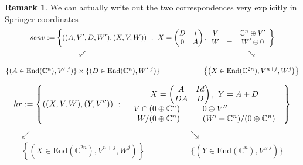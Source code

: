 \documentclass[12pt]{amsart}
\numberwithin{equation}{section}
\theoremstyle{definition}
\newtheorem{Remark}[equation]{Remark}
\numberwithin{figure}{section}
\newcommand{\C}{\mathbb{C}}
\begin{document}
\begin{Remark}
We can actually write out the two correspondences very explicitly in Springer coordinates
\begin{gather*}
senv := \left\{ \left(
    (A,V',D,W'),
    \left(X,V,W\right)\right)
  \ :\
  X = \begin{pmatrix} D & * \\ 0 & A \end{pmatrix}, 
  \begin{array}[c]{ccc} V &=& \C^n \oplus V'\\
    W &=& W'\oplus 0  \end{array}
  \right\} 
\\
\begin{matrix}
  \swarrow &&\searrow \\ \\
  \{(A \in \mathrm{End}(\C^n), V'^{\ j})\} \times  \{(D \in \mathrm{End}(\C^n), W'^{\ j})\}
  &\qquad\qquad&
  \left\{ \left(X \in  \mathrm{End}(\C^{2n}), V^{n+j}, W^j \right) \right\}
\end{matrix}
\end{gather*}

$$ 
hr := \left\{ \left((X,V,W),(Y,V'') \right)  \ :\ 
  \begin{array}[c]{c}
    X = \begin{pmatrix} A & Id \\ DA & D \end{pmatrix}, \   Y = A+D\\
    \begin{array}{rcl}
      V \cap (0\oplus \C^n) &=& 0 \oplus V'' \\
      W / (0\oplus \C^n) &=& (W' + \C^n)/(0\oplus \C^n)
    \end{array}
  \end{array}
\right\}   
$$
$$
\begin{matrix}
  \swarrow &&\searrow \\
  \left\{ \left(X \in  \mathrm{End}(\C^{2n}), V^{n+j}, W^j \right) \right\}
  &\qquad\qquad&
  \{(Y \in  \mathrm{End}(\C^n), V''^{\ j})\} 
\end{matrix}
$$

\end{Remark}
\end{document}
